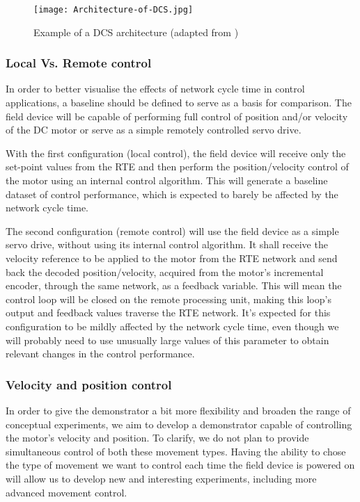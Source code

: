 \begin{figure}[htp]
	\centering
	\texttt{[image: Architecture-of-DCS.jpg]}
	\caption{Example of a DCS architecture (adapted from \cite{misc:dcs-architecture})}
	\label{fig:dcs-architecture}
\end{figure}

\subsubsection{Local Vs. Remote control} \label{subsec:local_remote}

In order to better visualise the effects of network cycle time in control applications, a baseline should be defined to serve as a basis for comparison.
The field device will be capable of performing full control of position and/or velocity of the DC motor or serve as a simple remotely controlled servo drive.

With the first configuration (local control), the field device will receive only the set-point values from the RTE and then perform the position/velocity control of the motor using an internal control algorithm.
This will generate a baseline dataset of control performance, which is expected to barely be affected by the network cycle time.

The second configuration (remote control) will use the field device as a simple servo drive, without using its internal control algorithm.
It shall receive the velocity reference to be applied to the motor from the RTE network and send back the decoded position/velocity, acquired from the motor's incremental encoder, through the same network, as a feedback variable.
This will mean the control loop will be closed on the remote processing unit, making this loop's output and feedback values traverse the RTE network.
It's expected for this configuration to be mildly affected by the network cycle time, even though we will probably need to use unusually large values of this parameter to obtain relevant changes in the control performance.

\subsubsection{Velocity and position control}

In order to give the demonstrator a bit more flexibility and broaden the range of conceptual experiments, we aim to develop a demonstrator capable of controlling the motor's velocity and position.
To clarify, we do not plan to provide simultaneous control of both these movement types.
Having the ability to chose the type of movement we want to control each time the field device is powered on will allow us to develop new and interesting experiments, including more advanced movement control.
